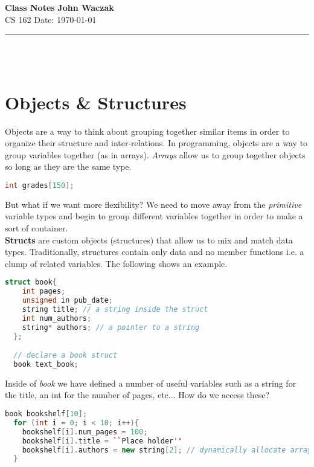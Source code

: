 \documentclass[a4paper, 11pt]{article}
\begin{document}
\noindent
\large\textbf{Class Notes} \hfill \textbf{John Waczak} \\
\normalsize CS 162 \hfill  Date: \today 
\par\noindent\rule{\textwidth}{0.4pt} \\\\


\section*{Objects \& Structures}
Objects are a way to think about grouping together similar items in order to
organize their structure and inter-relations. In programming, objects are a way
to group variables together (as in arrays). \textit{Arrays} allow us to group
together objects so long as they are the same type.

\begin{lstlisting}[language=C++]
  int grades[150]; 
\end{lstlisting}
But what if we want more flexibility? We need to move away from the
\textit{primitive} variable types and begin to group different variables
together in order to make a sort of container.\\ 

\textbf{Structs} are custom objects (structures) that allow us to mix and match
data types. Traditionally, structures contain only data and no member functions
i.e. a clump of related variables. The following shows an example. \\


\begin{lstlisting}[language=C++]
  struct book{
    int pages;
    unsigned in pub_date;
    string title; // a string inside the struct
    int num_authors;
    string* authors; // a pointer to a string
  };

  // declare a book struct
  book text_book; 
\end{lstlisting}
\vspace{1em}

Inside of \textit{book} we have defined a number of useful variables such as a
string for the title, an int for the number of pages, etc... How do we access
these?


\begin{lstlisting}[language=C++]
  book bookshelf[10];
  for (int i = 0; i < 10; i++){
    bookshelf[i].num_pages = 100;
    bookshelf[i].title = ``Place holder''
    bookshelf[i].authors = new string[2]; // dynamically allocate array 
  }
\end{lstlisting}
\end{document}
